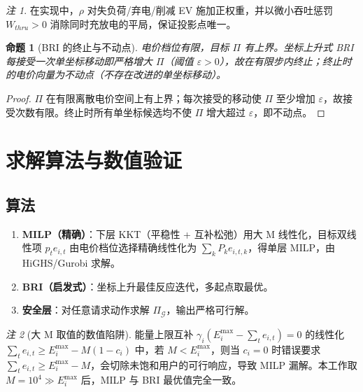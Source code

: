 \documentclass[UTF8,a4paper,11pt]{ctexart}
\newtheorem{proposition}{命题}
\theoremstyle{remark}
\newtheorem*{remark}{注}
\begin{document}
\begin{remark}
在实现中，$\rho$ 对失负荷/弃电/削减 EV 施加正权重，并以微小吞吐惩罚 $W_{thru}>0$ 消除同时充放电的平局，保证投影点唯一。
\end{remark}

\begin{proposition}[BRI 的终止与不动点]\label{prop:bri}
电价档位有限，目标 $\Pi$ 有上界。坐标上升式 BRI 每接受一次单坐标移动即严格增大 $\Pi$（阈值 $\varepsilon>0$），故在有限步内终止；终止时的电价向量为不动点（不存在改进的单坐标移动）。
\end{proposition}

\begin{proof}
$\Pi$ 在有限离散电价空间上有上界；每次接受的移动使 $\Pi$ 至少增加 $\varepsilon$，故接受次数有限。终止时所有单坐标候选均不使 $\Pi$ 增大超过 $\varepsilon$，即不动点。
\end{proof}

\section{求解算法与数值验证}

\subsection{算法}
\begin{enumerate}
  \item \textbf{MILP（精确）}：下层 KKT（平稳性 + 互补松弛）用大 M 线性化，目标双线性项 $p_t e_{i,t}$ 由电价档位选择精确线性化为 $\sum_k P_k e_{i,t,k}$，得单层 MILP，由 HiGHS/Gurobi 求解。
  \item \textbf{BRI（启发式）}：坐标上升最佳反应迭代，多起点取最优。
  \item \textbf{安全层}：对任意请求动作求解 $\Pi_{\mathcal{G}}$，输出严格可行解。
\end{enumerate}

\begin{remark}[大 M 取值的数值陷阱]
能量上限互补 $\gamma_i(E_i^{\max}-\sum_t e_{i,t})=0$ 的线性化 $\sum_t e_{i,t}\ge E_i^{\max}-M(1-c_i)$ 中，若 $M<E_i^{\max}$，则当 $c_i=0$ 时错误要求 $\sum_t e_{i,t}\ge E_i^{\max}-M$，会切除未饱和用户的可行响应，导致 MILP 漏解。本工作取 $M=10^4\gg E_i^{\max}$ 后，MILP 与 BRI 最优值完全一致。
\end{remark}
\end{document}
